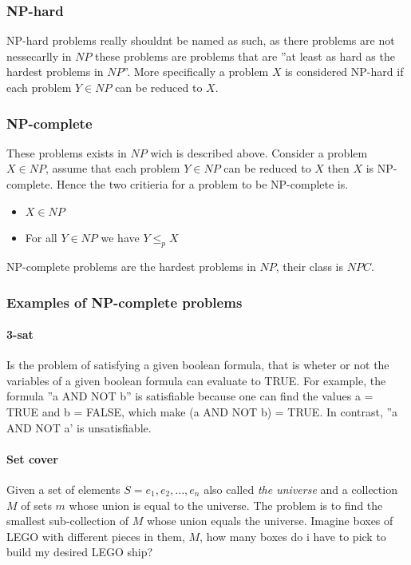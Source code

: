 \documentclass[12pt]{article} %
\begin{document}
\subsubsection{NP-hard}
NP-hard problems really shouldnt be named as such, as there problems are not nessecarlly in $NP$ these problems are problems that are ''at least as hard as the hardest problems in $NP$''. More specifically a problem $X$ is considered NP-hard if each problem $Y \in NP$ can be reduced to $X$.

\subsubsection{NP-complete}
These problems exists in $NP$ wich is described above. Consider a problem $X \in NP$, assume that each problem $Y \in NP$ can be reduced to $X$ then $X$ is NP-complete. Hence the two critieria for a problem to be NP-complete is.
\begin{itemize}
    \item $X \in NP$
    \item For all $Y \in NP$ we have $Y \leq_{p} X$
\end{itemize}
NP-complete problems are the hardest problems in $NP$, their class is $NPC$.

\subsubsection{Examples of NP-complete problems}

\paragraph{3-sat}
Is the problem of satisfying a given boolean formula, that is wheter or not the variables of a given boolean formula can evaluate to TRUE. For example, the formula ''a AND NOT b'' is satisfiable because one can find the values a = TRUE and b = FALSE, which make (a AND NOT b) = TRUE. In contrast, ''a AND NOT a' is unsatisfiable.

\paragraph{Set cover}
Given a set of elements $S = {e_{1}, e_{2}, \dots, e_{n}}$ also called \textit{the universe} and a collection $M$ of sets $m$ whose union is equal to the universe. The problem is to find the smallest sub-collection of $M$ whose union equals the universe. Imagine boxes of LEGO with different pieces in them, $M$, how many boxes do i have to pick to build my desired LEGO ship?
\end{document}
